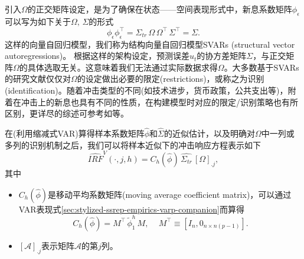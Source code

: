 引入$\Omega$的正交矩阵设定，是为了确保在状态——空间表现形式中，新息系数矩阵$\phi_{\epsilon}$可以写为如下关于$\Omega, \, \Sigma$的形式
\begin{equation}
  \label{eq:stylized-ssrep-svar-errorcoef-varcov}
  \phi_{\epsilon} \phi_{\epsilon}^{\top} = \Sigma_{tr} \, \Omega \, \Omega^{\top} \, \Sigma^{\top} = \Sigma.
\end{equation}
这样的向量自回归模型，我们称为结构向量自回归模型SVARs (structural vector autoregressions)。
根据这样的架构设定，预测误差$u_{t}$的协方差矩阵$\Sigma$，与正交矩阵$\Omega$的具体选取无关。这意味着我们无法通过实际数据求得$\Omega$。大多数基于SVARs的研究文献仅仅对$\Omega$的设定做出必要的限定(restrictions)，或称之为识别(identification)。随着冲击类型的不同(如技术进步，货币政策，公共支出等)，附着在冲击上的新息也具有不同的性质，在构建模型时对应的限定/识别策略也有所区别，更详尽的综述可参考如\cite{Cochrane:1994gi, Christiano:1999uw, Stock:2001bp}等。

在(利用缩减式VAR)算得样本系数矩阵$\hat{\phi}$和$\hat{\Sigma}$的近似估计，以及明确对$\Omega$中一列或多列的识别机制之后，我们可以将样本近似下的冲击响应方程表示如下
\begin{equation}
  \label{eq:stylized-ssrep-sample-irfs}
  \widehat{IRF}^{V} \left( \cdot , j, h\right)
  = C_h \left( \hat{\phi} \right) \, \hat{\Sigma_{tr}} \, \left[ \Omega \right]_{.j},
\end{equation}
其中
\begin{itemize}
  \item $C_h \left( \hat{\phi} \right)$是移动平均系数矩阵(moving average coefficient matrix)，可以通过VAR表现式\eqref{sec:stylized-ssrep-empirics-varp-companion}而算得
  \begin{equation}
    \label{eq:stylized-ssrep-sample-irfs-macoef}
    C_h \left( \hat{\phi} \right) = M^{\top} \, \widetilde{\phi}_{1}^{h} \, M, \quad \, M^{\top} \equiv \left[ I_{n}, 0_{n \times n \left( p - 1 \right)} \right].
  \end{equation}
  \item $\left[ \mathcal{A} \right]_{.j}$表示矩阵$\mathcal{A}$的第$j$列。
\end{itemize}
